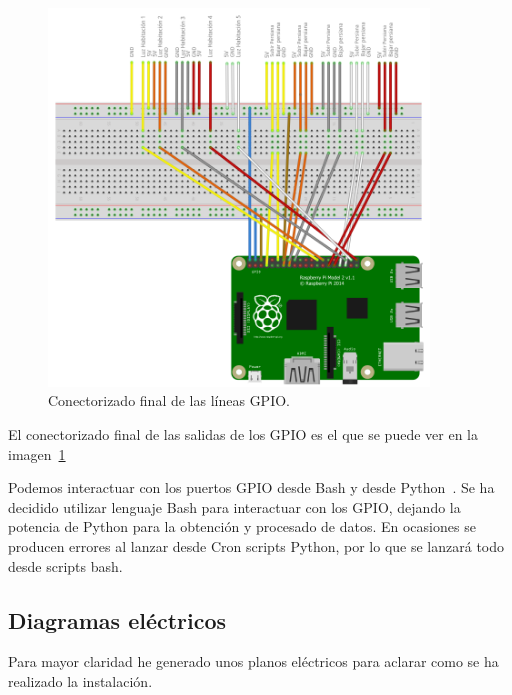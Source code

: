 \begin{figure}
    \centering
    \includegraphics[width=0.9\textwidth]{img/RbP_CompletaLineas.png}
    \caption{Conectorizado final de las líneas GPIO.} \label{Img:RbP_CompletaLineas}
\end{figure}

El conectorizado final de las salidas de los GPIO es el que se puede ver en la imagen~\ref{Img:RbP_CompletaLineas}

Podemos interactuar con los puertos GPIO desde Bash y desde Python~\cite{misc:Python}. Se ha decidido utilizar lenguaje Bash para interactuar con los GPIO, dejando la potencia de Python para la obtención y procesado de datos. En ocasiones se producen errores al lanzar desde Cron scripts Python, por lo que se lanzará todo desde scripts bash.


\subsection{Diagramas eléctricos}
Para mayor claridad he generado unos planos eléctricos para aclarar como se ha realizado la instalación.

